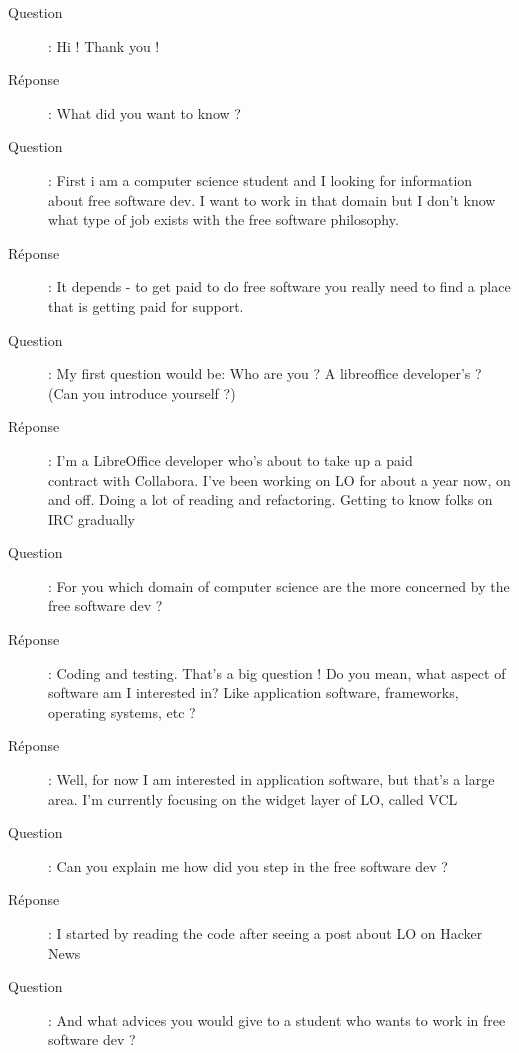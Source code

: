 \documentclass[a4paper,12pt, draft]{report}
\begin{document}
\begin{description}
\item [Question]:  Hi ! Thank you !
\item [Réponse]:  What did you want to know ?
\item [Question]:  First i am a computer science student and I looking for information about free software dev. I want to work in that domain but I don't know what type of job exists with the free software philosophy.
\item [Réponse]:  It depends - to get paid to do free software you really need to find a place that is getting paid for support.
\item [Question]:  My first question would be: Who are you ? A libreoffice developer's ? (Can you introduce yourself ?)
\item [Réponse]:  I'm a LibreOffice developer who's about to take up a paid \\contract with Collabora. I've been working on LO for about a year now, on and off. Doing a lot of reading and refactoring. Getting to know folks on IRC gradually
\item [Question]:  For you which domain of computer science are the more concerned by the free software dev ?
\item [Réponse]:  Coding and testing. That's a big question ! Do you mean, what aspect of software am I interested in? Like application software, frameworks, operating systems, etc ?
\item [Réponse]:  Well, for now I am interested in application software, but that's a large area. I'm currently focusing on the widget layer of LO, called VCL
\item [Question]:  Can you explain me how did you step in the free software dev ?
\item [Réponse]:  I started by reading the code after seeing a post about LO on Hacker News
\item [Question]:  And what advices you would give to a student who wants to work in free software dev ?

\end{description}
\end{document}
